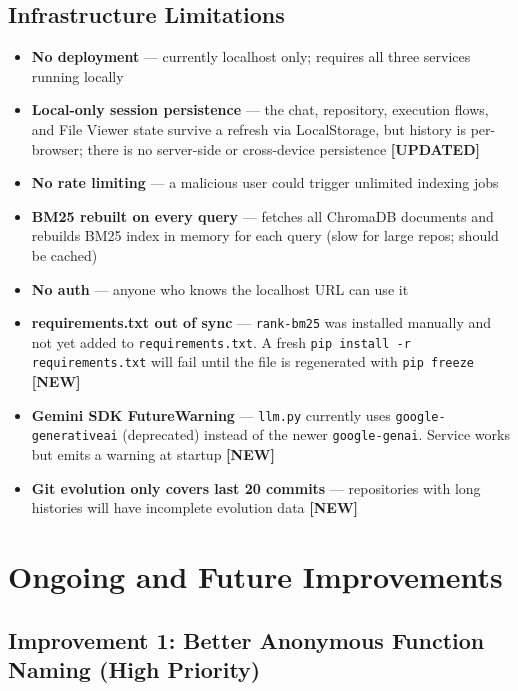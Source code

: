 \documentclass[a4paper,11pt]{article}
\begin{document}
\subsection{Infrastructure Limitations}
\begin{itemize}
    \item \textbf{No deployment} --- currently localhost only; requires all three services running locally
    \item \textbf{Local-only session persistence} --- the chat, repository, execution flows, and File Viewer state survive a refresh via LocalStorage, but history is per-browser; there is no server-side or cross-device persistence \textbf{[UPDATED]}
    \item \textbf{No rate limiting} --- a malicious user could trigger unlimited indexing jobs
    \item \textbf{BM25 rebuilt on every query} --- fetches all ChromaDB documents and rebuilds BM25 index in memory for each query (slow for large repos; should be cached)
    \item \textbf{No auth} --- anyone who knows the localhost URL can use it
    \item \textbf{requirements.txt out of sync} --- \texttt{rank-bm25} was installed manually and not yet added to \texttt{requirements.txt}. A fresh \texttt{pip install -r requirements.txt} will fail until the file is regenerated with \texttt{pip freeze} \textbf{[NEW]}
    \item \textbf{Gemini SDK FutureWarning} --- \texttt{llm.py} currently uses \texttt{google-generativeai} (deprecated) instead of the newer \texttt{google-genai}. Service works but emits a warning at startup \textbf{[NEW]}
    \item \textbf{Git evolution only covers last 20 commits} --- repositories with long histories will have incomplete evolution data \textbf{[NEW]}
\end{itemize}

\newpage

\section{Ongoing and Future Improvements}

\subsection{Improvement 1: Better Anonymous Function Naming (High Priority)}
\end{document}
